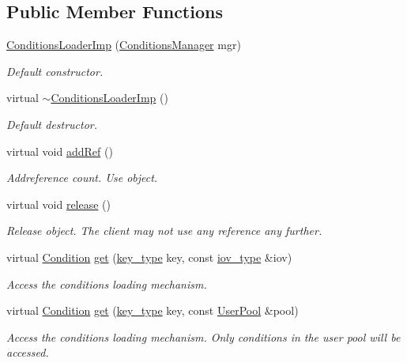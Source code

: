 \subsection*{Public Member Functions}
\begin{DoxyCompactItemize}
\item 
\hyperlink{class_d_d4hep_1_1_conditions_1_1_conditions_loader_imp_a15a84941b8bf86ada6c80f0a0aaea082}{Conditions\+Loader\+Imp} (\hyperlink{class_d_d4hep_1_1_conditions_1_1_conditions_manager}{Conditions\+Manager} mgr)
\begin{DoxyCompactList}\small\item\em Default constructor. \end{DoxyCompactList}\item 
virtual \hyperlink{class_d_d4hep_1_1_conditions_1_1_conditions_loader_imp_aff5e22b90011ae57c1ea4a5685ada304}{$\sim$\+Conditions\+Loader\+Imp} ()
\begin{DoxyCompactList}\small\item\em Default destructor. \end{DoxyCompactList}\item 
virtual void \hyperlink{class_d_d4hep_1_1_conditions_1_1_conditions_loader_imp_a6302206e3ebcdf712425df5468598e2c}{add\+Ref} ()
\begin{DoxyCompactList}\small\item\em Addreference count. Use object. \end{DoxyCompactList}\item 
virtual void \hyperlink{class_d_d4hep_1_1_conditions_1_1_conditions_loader_imp_a757ca1fe35b22abe5d4efde0fdc36396}{release} ()
\begin{DoxyCompactList}\small\item\em Release object. The client may not use any reference any further. \end{DoxyCompactList}\item 
virtual \hyperlink{class_d_d4hep_1_1_conditions_1_1_condition}{Condition} \hyperlink{class_d_d4hep_1_1_conditions_1_1_conditions_loader_imp_a0144aac3062bb704dd2c9557bed207da}{get} (\hyperlink{class_d_d4hep_1_1_conditions_1_1_conditions_loader_ac77fe60ee60373d61aed19b200949c93}{key\+\_\+type} key, const \hyperlink{class_d_d4hep_1_1_conditions_1_1_conditions_loader_a5647851492a3b1469208473fe6d96329}{iov\+\_\+type} \&iov)
\begin{DoxyCompactList}\small\item\em Access the conditions loading mechanism. \end{DoxyCompactList}\item 
virtual \hyperlink{class_d_d4hep_1_1_conditions_1_1_condition}{Condition} \hyperlink{class_d_d4hep_1_1_conditions_1_1_conditions_loader_imp_a742f7d5a8d3d0666ee64baa3502982ce}{get} (\hyperlink{class_d_d4hep_1_1_conditions_1_1_conditions_loader_ac77fe60ee60373d61aed19b200949c93}{key\+\_\+type} key, const \hyperlink{class_d_d4hep_1_1_conditions_1_1_user_pool}{User\+Pool} \&pool)
\begin{DoxyCompactList}\small\item\em Access the conditions loading mechanism. Only conditions in the user pool will be accessed. \end{DoxyCompactList}\end{DoxyCompactItemize}

